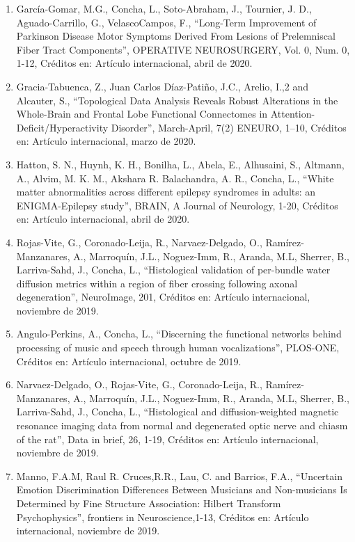 \documentclass[12pt]{article}
\begin{document}
\begin{enumerate}
\item García-Gomar, M.G., Concha, L., Soto-Abraham, J., Tournier, J. D., Aguado-Carrillo, G., VelascoCampos, F., “Long-Term Improvement 
of Parkinson Disease Motor Symptoms Derived From Lesions of Prelemniscal Fiber Tract Components”, OPERATIVE NEUROSURGERY, Vol. 0, Num. 
0, 1-12, Créditos en: Artículo internacional, abril de 2020.

\item Gracia-Tabuenca, Z., Juan Carlos Díaz-Patiño, J.C., Arelio, I.,2 and Alcauter, S., “Topological Data Analysis Reveals Robust 
Alterations in the Whole-Brain and Frontal Lobe Functional Connectomes in Attention-Deficit/Hyperactivity Disorder”, March-April, 7(2) 
ENEURO, 1–10, Créditos en: Artículo internacional, marzo de 2020.

\item Hatton, S. N., Huynh, K. H., Bonilha, L., Abela, E., Alhusaini, S., Altmann, A., Alvim, M. K. M., Akshara R. Balachandra, A. R., 
Concha, L., “White matter abnormalities across different epilepsy syndromes in adults: an ENIGMA-Epilepsy study”, BRAIN, A Journal of 
Neurology, 1-20, Créditos en: Artículo internacional, abril de 2020.

\item Rojas-Vite, G., Coronado-Leija, R., Narvaez-Delgado, O., Ramírez-Manzanares, A., Marroquín, J.L., Noguez-Imm, R., Aranda, M.L, 
Sherrer, B., Larriva-Sahd, J., Concha, L., “Histological validation of per-bundle water diffusion metrics within a region of fiber 
crossing following axonal degeneration”, NeuroImage, 201, Créditos en: Artículo internacional, noviembre de 2019.

\item Angulo-Perkins, A., Concha, L., “Discerning the functional networks behind processing of music and speech through human 
vocalizations”, PLOS-ONE, Créditos en: Artículo internacional, octubre de 2019.

\item Narvaez-Delgado, O., Rojas-Vite, G., Coronado-Leija, R., Ramírez-Manzanares, A., Marroquín, J.L., Noguez-Imm, R., Aranda, M.L, 
Sherrer, B., Larriva-Sahd, J., Concha, L., “Histological and diffusion-weighted magnetic resonance imaging data from normal and 
degenerated optic nerve and chiasm of the rat”, Data in brief, 26, 1-19, Créditos en: Artículo internacional, noviembre de 2019.

\item Manno, F.A.M, Raul R. Cruces,R.R., Lau, C. and Barrios, F.A., “Uncertain Emotion Discrimination Differences Between Musicians and 
Non-musicians Is Determined by Fine Structure Association: Hilbert Transform Psychophysics”, frontiers in Neuroscience,1-13, Créditos 
en: Artículo internacional, noviembre de 2019.


\end{enumerate}
\end{document}
